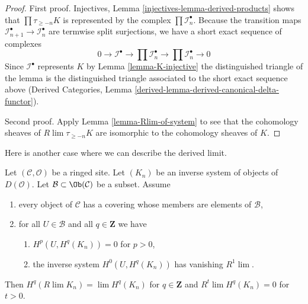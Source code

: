 \begin{proof}
First proof. Injectives, Lemma \ref{injectives-lemma-derived-products}
shows that $\prod \tau_{\geq -n}K$ is represented by the complex
$\prod \mathcal{I}_n^\bullet$. Because the transition maps
$\mathcal{I}_{n + 1}^\bullet \to \mathcal{I}_n^\bullet$
are termwise split surjections, we have a short exact sequence of
complexes
$$
0 \to \mathcal{I}^\bullet \to
\prod \mathcal{I}_n^\bullet \to \prod \mathcal{I}_n^\bullet \to 0
$$
Since $\mathcal{I}^\bullet$ represents $K$ by
Lemma \ref{lemma-K-injective}
the distinguished triangle of the lemma is the distinguished
triangle associated to the short exact sequence above
(Derived Categories, Lemma
\ref{derived-lemma-derived-canonical-delta-functor}).

\medskip\noindent
Second proof. Apply Lemma \ref{lemma-Rlim-of-system} to see that the
cohomology sheaves of $R\lim \tau_{\geq -n}K$ are isomorphic to the
cohomology sheaves of $K$.
\end{proof}

\noindent
Here is another case where we can describe the derived limit.

\begin{lemma}
\label{lemma-derived-limit-suitable-system}
Let $(\mathcal{C}, \mathcal{O})$ be a ringed site. Let $(K_n)$
be an inverse system of objects of $D(\mathcal{O})$.
Let $\mathcal{B} \subset \Ob(\mathcal{C})$ be a subset. Assume
\begin{enumerate}
\item every object of $\mathcal{C}$ has a covering whose members are
elements of $\mathcal{B}$,
\item for all $U \in \mathcal{B}$ and all $q \in \mathbf{Z}$ we have
\begin{enumerate}
\item $H^p(U, H^q(K_n)) = 0$ for $p > 0$,
\item the inverse system $H^0(U, H^q(K_n))$ has vanishing $R^1\lim$.
\end{enumerate}
\end{enumerate}
Then $H^q(R\lim K_n) = \lim H^q(K_n)$ for $q \in \mathbf{Z}$
and $R^t\lim H^q(K_n) = 0$ for $t > 0$.
\end{lemma}

